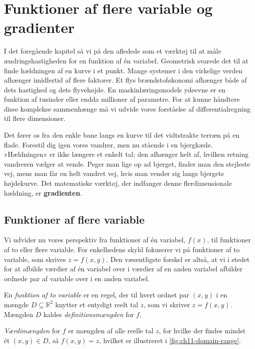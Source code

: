 \chapter{Funktioner af flere variable og gradienter}
\label{chap:ch11}

I det foregående kapitel så vi på den afledede som et værktøj til at måle ændringshastigheden for en funktion af én variabel. Geometrisk svarede det til at finde hældningen af en kurve i et punkt. Mange systemer i den virkelige verden afhænger imidlertid af flere faktorer. Et flys brændstoføkonomi afhænger både af dets hastighed og dets flyvehøjde. En maskinlæringsmodels ydeevne er en funktion af tusinder eller endda millioner af parametre. For at kunne håndtere disse komplekse sammenhænge må vi udvide vores forståelse af differentialregning til flere dimensioner.

Det fører os fra den enkle bane langs en kurve til det vidtstrakte terræn på en flade. Forestil dig igen vores vandrer, men nu stående i en bjergkæde. »Hældningen« er ikke længere et enkelt tal; den afhænger helt af, hvilken retning vandreren vælger at vende. Peger man lige op ad bjerget, finder man den stejleste vej, mens man får en helt vandret vej, hvis man vender sig langs bjergets højdekurve. Det matematiske værktøj, der indfanger denne flerdimensionale hældning, er \textbf{gradienten}.


\section{Funktioner af flere variable}

Vi udvider nu vores perspektiv fra funktioner af én variabel, \(f(x)\), til funktioner af to eller flere variable. For enkelhedens skyld fokuserer vi på funktioner af to variable, som skrives \(z = f(x, y)\). Den væsentligste forskel er altså, at vi i stedet for at afbilde værdier af én variabel over i værdier af en anden variabel afbilder ordnede par af variable over i en anden variabel.

\begin{definition}
En \emph{funktion af to variable} er en regel, der til hvert ordnet par \((x, y)\) i en mængde \(D \subseteq \mathbb{R}^2\) knytter et entydigt reelt tal \(z\), som vi skriver \(z = f(x, y)\). Mængden \(D\) kaldes \emph{definitionsmængden} for \(f\).

\emph{Værdimængden} for \(f\) er mængden af alle reelle tal \(z\), for hvilke der findes mindst ét \((x, y) \in D\), så \(f(x, y) = z\), hvilket er illustreret i \autoref{fig:ch11-domain-range}.
\end{definition}

